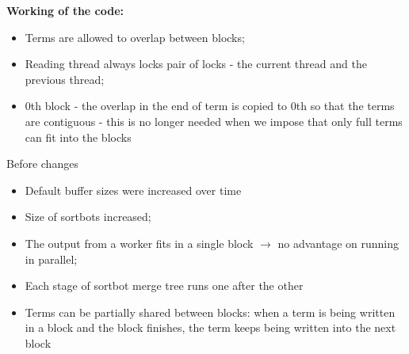 \documentclass[11pt]{beamer}
\begin{document}
\begin{frame}
\textbf{Working of the code:}
\begin{itemize}
\item Terms are allowed to overlap between blocks;
\item Reading thread always locks pair of locks - the current thread and the previous thread;
\item 0th block - the overlap in the end of term is copied to 0th so that the terms are contiguous - this is no longer needed when we impose that only full terms can fit into the blocks
\end{itemize}
\end{frame}










\begin{frame}
Before changes
\begin{itemize}
\item Default buffer sizes were increased over time 
\item Size of sortbots increased;
\item The output from a worker fits in a single block $\longrightarrow$ no advantage on running in parallel;
\item Each stage of sortbot merge tree runs one after the other
\item Terms can be partially shared between blocks: when a term is being written in a block and the block finishes, the term keeps being written into the next block
\end{itemize}
\end{frame}
\end{document}
